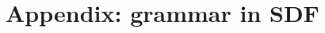 \documentclass[a4paper]{article}
\begin{document}
\begin{comment}
\inferrule*[right=Call]{
\Lambda(f) = \langle \Gamma', \Lambda', \lambda x_1,...,x_n\; S\rangle\\
1 \leq i \leq n \\
\Gamma, \Lambda \vdash_E e_i \rightarrow v_i\\
\Gamma[x_1/v_1]...[x_n/v_n],\Lambda, \beta \vdash_S S \rightarrow s
}{
\Gamma, \Lambda, \beta \vdash_M f_n(e_1,...,e_n) \rightarrow  s
}
\end{mathpar}
\caption{Semantics of markup forms\label{SEM:markup}}
\end{semantics}

\end{comment}

\newpage
\section*{Appendix: grammar in SDF}
\label{SECT:sdfgrammar}


\end{document}
